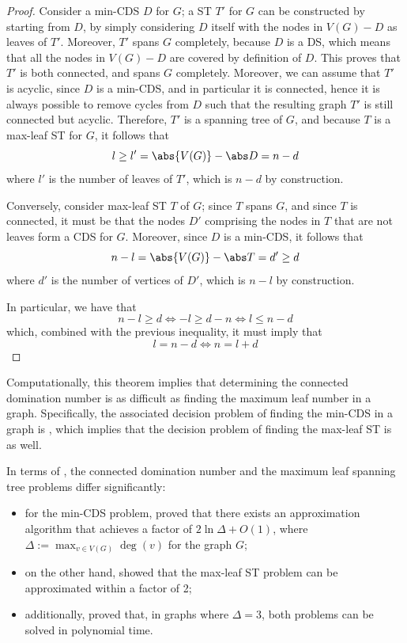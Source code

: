 \documentclass[a4paper, 12pt]{report}
\begin{document}
    \begin{proof}
        Consider a min-CDS $D$ for $G$; a ST $T'$ for $G$ can be constructed by starting from $D$, by simply considering $D$ itself with the nodes in $V(G) - D$ as leaves of $T'$. Moreover, $T'$ spans $G$ completely, because $D$ is a DS, which means that all the nodes in $V(G) - D$ are covered by definition of $D$. This proves that $T'$ is both connected, and spans $G$ completely. Moreover, we can assume that $T'$ is acyclic, since $D$ is a min-CDS, and in particular it is connected, hence it is always possible to remove cycles from $D$ such that the resulting graph $T'$ is still connected but acyclic. Therefore, $T'$ is a spanning tree of $G$, and because $T$ is a max-leaf ST for $G$, it follows that $$l \ge l' = \abs{V(G)} - \abs D = n - d$$ where $l'$ is the number of leaves of $T'$, which is $n - d$ by construction.

        Conversely, consider max-leaf ST $T$ of $G$; since $T$ spans $G$, and since $T$ is connected, it must be that the nodes $D'$ comprising the nodes in $T$ that are not leaves form a CDS for $G$. Moreover, since $D$ is a min-CDS, it follows that $$n - l = \abs{V(G)} - \abs T = d' \ge d$$ where $d'$ is the number of vertices of $D'$, which is $n - l$ by construction.

        In particular, we have that $$n - l \ge d \iff -l \ge d - n \iff l \le n - d$$ which, combined with the previous inequality, it must imply that $$l = n - d \iff n = l + d$$
    \end{proof}

    Computationally, this theorem implies that determining the connected domination number is as difficult as finding the maximum leaf number in a graph. Specifically, the associated decision problem of finding the min-CDS in a graph is \NPComplete, which implies that the decision problem of finding the max-leaf ST is \NPComplete as well.

    In terms of , the connected domination number and the maximum leaf spanning tree problems differ significantly:

    \begin{itemize}
        \item for the min-CDS problem, \textcite{guha} proved that there exists an approximation algorithm that achieves a factor of $2 \ln \Delta + O(1)$, where $\Delta := \max_{v \in V(G)}{\deg(v)}$ for the graph $G$;

        \item on the other hand, \textcite{solisoba} showed that the max-leaf ST problem can be approximated within a factor of 2;

        \item additionally, \textcite{ueno} proved that, in graphs where $\Delta = 3$, both problems can be solved in polynomial time. 
    \end{itemize}
\end{document}
